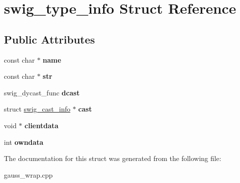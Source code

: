\hypertarget{structswig__type__info}{\section{swig\-\_\-type\-\_\-info Struct Reference}
\label{structswig__type__info}
}
\subsection*{Public Attributes}
\begin{DoxyCompactItemize}
\item 
\hypertarget{structswig__type__info_a90a9c6a25aa3e923978005ecbe23ad60}{const char $\ast$ {\bfseries name}}\label{structswig__type__info_a90a9c6a25aa3e923978005ecbe23ad60}

\item 
\hypertarget{structswig__type__info_abbe7cc58a083feb4329b748643324064}{const char $\ast$ {\bfseries str}}\label{structswig__type__info_abbe7cc58a083feb4329b748643324064}

\item 
\hypertarget{structswig__type__info_a07df4bedf85be77b23756b531b60e0dd}{swig\-\_\-dycast\-\_\-func {\bfseries dcast}}\label{structswig__type__info_a07df4bedf85be77b23756b531b60e0dd}

\item 
\hypertarget{structswig__type__info_a3ee3f7ef20e965b6c798d79723a96f9b}{struct \hyperlink{structswig__cast__info}{swig\-\_\-cast\-\_\-info} $\ast$ {\bfseries cast}}\label{structswig__type__info_a3ee3f7ef20e965b6c798d79723a96f9b}

\item 
\hypertarget{structswig__type__info_a19bdd65dceb89cd54befd3ded06558b7}{void $\ast$ {\bfseries clientdata}}\label{structswig__type__info_a19bdd65dceb89cd54befd3ded06558b7}

\item 
\hypertarget{structswig__type__info_a93c25d5903cbfcb82208eea7227c32bd}{int {\bfseries owndata}}\label{structswig__type__info_a93c25d5903cbfcb82208eea7227c32bd}

\end{DoxyCompactItemize}


The documentation for this struct was generated from the following file\-:\begin{DoxyCompactItemize}
\item 
gauss\-\_\-wrap.\-cpp\end{DoxyCompactItemize}
